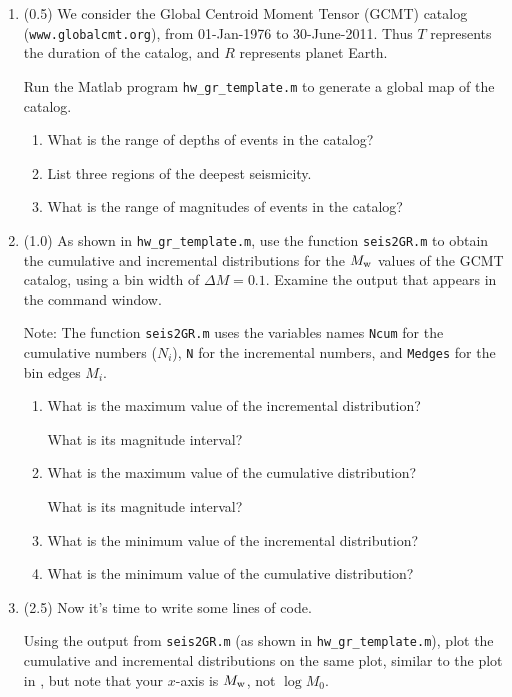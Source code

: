 \documentclass[11pt,titlepage,fleqn]{article}
\begin{document}
\begin{enumerate}
\item (0.5) We consider the Global Centroid Moment Tensor (GCMT) catalog (\verb+www.globalcmt.org+), from 01-Jan-1976 to 30-June-2011. Thus $T$ represents the duration of the catalog, and $R$ represents planet Earth.

Run the Matlab program \verb+hw_gr_template.m+ to generate a global map of the catalog.
%
\begin{enumerate}
\item What is the range of depths of events in the catalog?
\item List three regions of the deepest seismicity.
\item What is the range of magnitudes of events in the catalog?
\end{enumerate}

\item (1.0) As shown in \verb+hw_gr_template.m+, use the function \verb+seis2GR.m+ to obtain the cumulative and incremental distributions for the $M_{\rm w}$ values of the GCMT catalog, using a bin width of $\Delta M = 0.1$. Examine the output that appears in the command window.

Note: The function \verb+seis2GR.m+ uses the variables names \verb+Ncum+ for the cumulative numbers ($N_i$), \verb+N+ for the incremental numbers, and \verb+Medges+ for the bin edges $M_i$.

\begin{enumerate}
\item What is the maximum value of the incremental distribution?

What is its magnitude interval?

\item What is the maximum value of the cumulative distribution?

What is its magnitude interval?

\item What is the minimum value of the incremental distribution? 

\item What is the minimum value of the cumulative distribution? 
\end{enumerate}


\item (2.5) Now it's time to write some lines of code.

Using the output from \verb+seis2GR.m+ (as shown in \verb+hw_gr_template.m+), plot the cumulative and incremental distributions on the same plot, similar to the plot in \citet[][Figure~4.7-2]{SteinWysession}, but note that your $x$-axis is $M_{\rm w}$, not $\log M_0$.


\end{enumerate}
\end{document}
